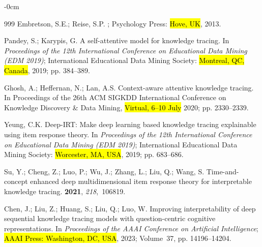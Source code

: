 \documentclass[applsci,article,accept,moreauthors,pdftex]{Definitions/mdpi}
\begin{document}
\begin{adjustwidth}{-\extralength}{0cm}
\begin{thebibliography}{999}
Embretson, S.E.; Reise, S.P.
; Psychology Press: \hl{Hove, UK},
  2013.



Pandey, S.; Karypis, G.
\newblock A self-attentive model for knowledge tracing.
\newblock In \textit{Proceedings of the 12th International
  Conference on Educational Data Mining (EDM 2019)}; International Educational
  Data Mining Society: \hl{Montreal, QC, Canada},  2019; pp. 384--389.
\newblock 

Ghosh, A.; Heffernan, N.; Lan, A.S.
\newblock Context-aware attentive knowledge tracing.
\newblock In Proceedings of the 26th ACM SIGKDD International Conference on
  Knowledge Discovery \& Data Mining, \hl{Virtual, 6--10 July} %
 2020; pp. 2330--2339.

Yeung, C.K.
\newblock Deep-IRT: Make deep learning based knowledge tracing explainable
  using item response theory.
\newblock In \textit{Proceedings of the 12th International
  Conference on Educational Data Mining (EDM 2019)}; International Educational
  Data Mining Society: \hl{Worcester, MA, USA},  2019; pp. 683--686.


Su, Y.; Cheng, Z.; Luo, P.; Wu, J.; Zhang, L.; Liu, Q.; Wang, S.
\newblock Time-and-concept enhanced deep multidimensional item response theory
  for interpretable knowledge tracing.
 {\bf 2021}, {\em 218},~106819.

Chen, J.; Liu, Z.; Huang, S.; Liu, Q.; Luo, W.
\newblock Improving interpretability of deep sequential knowledge tracing
  models with question-centric cognitive representations.
\newblock In \textit{Proceedings of the AAAI Conference on
  Artificial Intelligence}; \hl{AAAI Press: Washington, DC, USA},  2023; Volume~37, pp. 14196--14204.


\end{thebibliography}
\end{adjustwidth}
\end{document}
